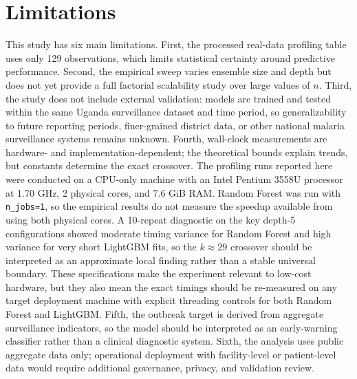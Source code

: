 \documentclass[11pt]{article}
\begin{document}
\section{Limitations}
This study has six main limitations. First, the processed real-data profiling table uses only 129 observations, which limits statistical certainty around predictive performance. Second, the empirical sweep varies ensemble size and depth but does not yet provide a full factorial scalability study over large values of $n$. Third, the study does not include external validation: models are trained and tested within the same Uganda surveillance dataset and time period, so generalizability to future reporting periods, finer-grained district data, or other national malaria surveillance systems remains unknown. Fourth, wall-clock measurements are hardware- and implementation-dependent; the theoretical bounds explain trends, but constants determine the exact crossover. The profiling runs reported here were conducted on a CPU-only machine with an Intel Pentium 3558U processor at 1.70 GHz, 2 physical cores, and 7.6 GiB RAM. Random Forest was run with \texttt{n\_jobs=1}, so the empirical results do not measure the speedup available from using both physical cores. A 10-repeat diagnostic on the key depth-5 configurations showed moderate timing variance for Random Forest and high variance for very short LightGBM fits, so the $k\approx29$ crossover should be interpreted as an approximate local finding rather than a stable universal boundary. These specifications make the experiment relevant to low-cost hardware, but they also mean the exact timings should be re-measured on any target deployment machine with explicit threading controls for both Random Forest and LightGBM. Fifth, the outbreak target is derived from aggregate surveillance indicators, so the model should be interpreted as an early-warning classifier rather than a clinical diagnostic system. Sixth, the analysis uses public aggregate data only; operational deployment with facility-level or patient-level data would require additional governance, privacy, and validation review.
\end{document}
